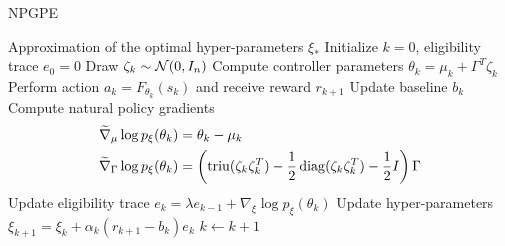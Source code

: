 \begin{algorithm}[t!]
	\caption{NPGPE}
	\label{algo:NPGPE}
	\begin{algorithmic}[1]
		\Ensure Approximation of the optimal hyper-parameters $\xi_*$
		\State Initialize $k = 0$, eligibility trace $e_0 = 0$
		\Repeat
			\State Draw $\zeta_k \sim \mathcal{N}(0, I_n)$
			\State Compute controller parameters $\theta_k = \mu_k + \Gamma^T \zeta_k$
			\State Perform action $a_k = F_{\theta_k}(s_k)$ and receive reward $r_{k+1}$
			\State Update baseline $b_k$
			\State Compute natural policy gradients
				\begin{equation*}
					\begin{split}
						\widetilde{\nabla}_\mu \log p_\xi(\theta_k) &= \theta_k - \mu_k\\
						\widetilde{\nabla}_\Gamma \log p_\xi(\theta_k) &= \left(\operatorname{triu}(\zeta_k \zeta_k^T) - \frac{1}{2} \operatorname{diag}(\zeta_k \zeta_k^T) - \frac{1}{2} I \right) \Gamma
					\end{split}
				\end{equation*}
			\State Update eligibility trace $e_{k} = \lambda e_{k-1} + \nabla_\xi \log p_\xi(\theta_k)$
			\State Update hyper-parameters $\xi_{k+1} = \xi_k + \alpha_k (r_{k+1} - b_k) e_k$
			\State $k \leftarrow k + 1$
	\end{algorithmic}
\end{algorithm}  


